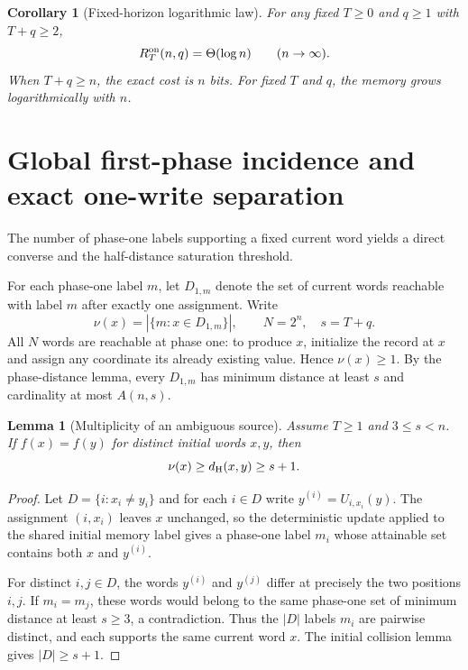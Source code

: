 \documentclass[11pt,a4paper]{article}
\newtheorem{lemma}[theorem]{Lemma}
\newtheorem{corollary}[theorem]{Corollary}
\newcommand{\dist}{d_{\rm H}}
\begin{document}
\begin{corollary}[Fixed-horizon logarithmic law]\label{cor:fixed}
For any fixed $T\ge0$ and $q\ge1$ with $T+q\ge2$,
\[
 R_T^{\rm on}(n,q)=\Theta(\log n)\qquad (n\to\infty).
\]
When $T+q\ge n$, the exact cost is $n$ bits. For fixed $T$ and $q$, the memory grows logarithmically with $n$.
\end{corollary}





\section{Global first-phase incidence and exact one-write separation}\label{sec:incidence}

The number of phase-one labels supporting a fixed current word yields a direct converse and the half-distance saturation threshold.

For each phase-one label $m$, let $D_{1,m}$ denote the set of current words reachable with label $m$ after exactly one assignment. Write
\[
 \nu(x)=|\{m:x\in D_{1,m}\}|,
 \qquad N=2^n,\quad s=T+q.
\]
All $N$ words are reachable at phase one: to produce $x$, initialize the record at $x$ and assign any coordinate its already existing value. Hence $\nu(x)\ge1$. By the phase-distance lemma, every $D_{1,m}$ has minimum distance at least $s$ and cardinality at most $A(n,s)$.

\begin{lemma}[Multiplicity of an ambiguous source]\label{lem:incidence}
Assume $T\ge1$ and $3\le s<n$. If $f(x)=f(y)$ for distinct initial words $x,y$, then
\[
 \nu(x)\ge\dist(x,y)\ge s+1.
\]
\end{lemma}
\begin{proof}
Let $D=\{i:x_i\ne y_i\}$ and for each $i\in D$ write $y^{(i)}=U_{i,x_i}(y)$. The assignment $(i,x_i)$ leaves $x$ unchanged, so the deterministic update applied to the shared initial memory label gives a phase-one label $m_i$ whose attainable set contains both $x$ and $y^{(i)}$.

For distinct $i,j\in D$, the words $y^{(i)}$ and $y^{(j)}$ differ at precisely the two positions $i,j$. If $m_i=m_j$, these words would belong to the same phase-one set of minimum distance at least $s\ge3$, a contradiction. Thus the $|D|$ labels $m_i$ are pairwise distinct, and each supports the same current word $x$. The initial collision lemma gives $|D|\ge s+1$.
\end{proof}
\end{document}
